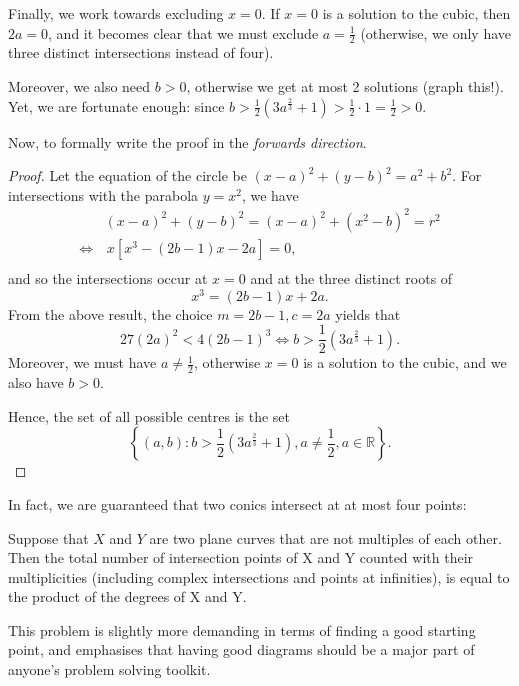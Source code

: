 \documentclass[../jarvis.tex]{subfiles}
\begin{document}
Finally, we work towards excluding $x=0$. If $x=0$ is a solution to the cubic, then $2a=0$, and it becomes clear that we must exclude $a=\frac{1}{2}$ (otherwise, we only have three distinct intersections instead of four).

Moreover, we also need $b > 0$, otherwise we get at most 2 solutions (graph this!). Yet, we are fortunate enough: since $b > \frac{1}{2}\left(3a^{\frac{2}{3}}+1\right) > \frac{1}{2}\cdot 1 = \frac{1}{2} > 0$.

Now, to formally write the proof in the \textit{forwards direction}.
\begin{proof}
Let the equation of the circle be $(x-a)^2+(y-b)^2=a^2+b^2$.
For intersections with the parabola $y=x^2$, we have
\begin{align*}
    &(x-a)^2+(y-b)^2 =(x-a)^2+(x^2-b)^2=r^2 \\
    \Longleftrightarrow& \,x\left[x^3-(2b-1)x-2a\right]=0,\\
\end{align*}
and so the intersections occur at $x=0$ and at the three distinct roots of 
$$x^3=(2b-1)x+2a.$$
From the above result, the choice $m=2b-1, c=2a$ yields that $$27(2a)^2 < 4(2b-1)^3 \Longleftrightarrow b > \frac{1}{2}\left(3a^{\frac{2}{3}}+1\right).$$
Moreover, we must have $a \neq \frac{1}{2}$, otherwise $x=0$ is a solution to the cubic, and we also have $b > 0$. 

Hence, the set of all possible centres is the set 
$$\left\{(a,b): b > \frac{1}{2}\left(3a^{\frac{2}{3}}+1\right), a\neq \frac{1}{2}, a \in \mathbb{R}\right\}.$$
\end{proof}

In fact, we are guaranteed that two conics intersect at at most four points:
\begin{theorem}
Suppose that $X$ and $Y$ are two plane curves that are not multiples of each other. Then the total number of intersection points of X and Y counted with their multiplicities (including complex intersections and points at infinities), is equal to the product of the degrees of X and Y.
\end{theorem}

\begin{moral}
This problem is slightly more demanding in terms of finding a good starting point, and emphasises that having good diagrams should be a major part of anyone's problem solving toolkit.
\end{moral}
\end{document}
